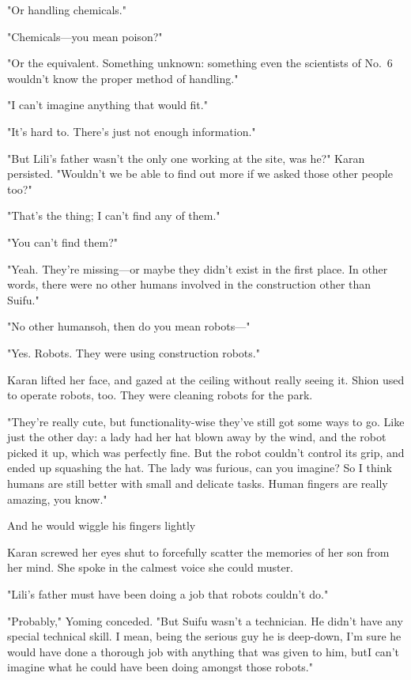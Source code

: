"Or handling chemicals."

"Chemicals---you mean poison?"

"Or the equivalent. Something unknown: something even the scientists of
No.~6 wouldn't know the proper method of handling."

"I can't imagine anything that would fit."

"It's hard to. There's just not enough information."

"But Lili's father wasn't the only one working at the site, was he?"
Karan persisted. "Wouldn't we be able to find out more if we asked those
other people too?"

"That's the thing; I can't find any of them."

"You can't find them?"

"Yeah. They're missing---or maybe they didn't exist in the first place. In
other words, there were no other humans involved in the construction
other than Suifu."

"No other humans\el oh, then do you mean robots---"

"Yes. Robots. They were using construction robots."

Karan lifted her face, and gazed at the ceiling without really seeing
it. Shion used to operate robots, too. They were cleaning robots for the
park.

"They're really cute, but functionality-wise they've still got some ways
to go. Like just the other day: a lady had her hat blown away by the
wind, and the robot picked it up, which was perfectly fine. But the
robot couldn't control its grip, and ended up squashing the hat. The
lady was furious, can you imagine? So I think humans are still better
with small and delicate tasks. Human fingers are really amazing, you
know."

And he would wiggle his fingers lightly\el 

Karan screwed her eyes shut to forcefully scatter the memories of her
son from her mind. She spoke in the calmest voice she could muster.

"Lili's father must have been doing a job that robots couldn't do."

"Probably," Yoming conceded. "But Suifu wasn't a technician. He didn't
have any special technical skill. I mean, being the serious guy he is
deep-down, I'm sure he would have done a thorough job with anything that
was given to him, but\el I can't imagine what he could have been doing
amongst those robots."

